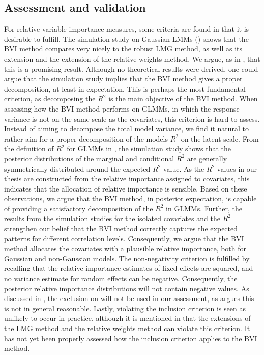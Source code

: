 \subsection*{Assessment and validation}
For relative variable importance measures, some criteria are found in  that it is desirable to fulfill. The simulation study on Gaussian LMMs () shows that the BVI method compares very nicely to the robust LMG method, as well as its extension and the extension of the relative weights method. We argue, as in \citet{Arnstad:Relative_variable_importance_in_Bayesian_linear_mixed_models:2024}, that this is a promising result. Although no theoretical results were derived, one could argue that the simulation study implies that the BVI method gives a proper decomposition, at least in expectation. This is perhaps the most fundamental criterion, as decomposing the $R^2$ is the main objective of the BVI method.
When assessing how the BVI method performs on GLMMs, in which the response variance is not on the same scale as the covariates, this criterion is hard to assess. Instead of aiming to decompose the total model variance, we find it natural to rather aim for a proper decomposition of the models $R^2$ on the latent scale. From the definition of $R^2$ for GLMMs in \citet{nakagawa2013general}, the simulation study shows that the posterior distributions of the marginal and conditional $R^2$ are generally symmetrically distributed around the expected $R^2$ value. As the $R^2$ values in our thesis are constructed from the relative importance assigned to covariates, this indicates that the allocation of relative importance is sensible. Based on these observations, we argue that the BVI method, in posterior expectation, is capable of providing a satisfactory decomposition of the $R^2$ in GLMMs. Further, the results from the simulation studies for the isolated covariates and the $R^2$ strengthen our belief that the BVI method correctly captures the expected patterns for different correlation levels. Consequently, we argue that the BVI method allocates the covariates with a plausible relative importance, both for Gaussian and non-Gaussian models.
The non-negativity criterion is fulfilled by recalling that the relative importance estimates of fixed effects are squared, and no variance estimate for random effects can be negative. Consequently, the posterior relative importance distributions will not contain negative values. As discussed in \citet{Arnstad:Relative_variable_importance_in_Bayesian_linear_mixed_models:2024}, the exclusion on will not be used in our assessment, as \citet{gromping_relaimpo} argues this is not in general reasonable. Lastly, violating  the inclusion criterion is seen as unlikely to occur in practice, although it is mentioned in \citet{matre} that the extensions of the LMG method and the relative weights method can violate this criterion. It has not yet been properly assessed how the inclusion criterion applies to the BVI method. 
